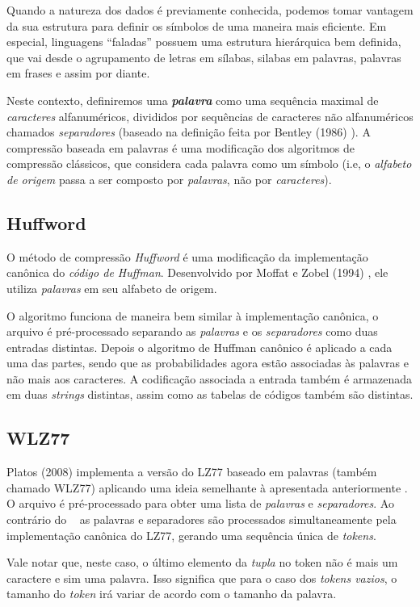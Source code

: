 Quando a natureza dos dados é previamente conhecida, podemos tomar vantagem da sua estrutura para definir os símbolos de uma maneira mais eficiente. 
Em especial, linguagens ``faladas'' possuem uma estrutura hierárquica bem definida, que vai desde o agrupamento de letras em sílabas, silabas em palavras, palavras em frases e assim por diante. 

Neste contexto, definiremos uma \textbf{\emph{palavra}} como uma sequência maximal de \emph{caracteres} alfanuméricos, divididos por sequências de caracteres não alfanuméricos chamados \emph{separadores} (baseado na definição feita por Bentley (1986) \cite{Bentley}).
A compressão baseada em palavras é uma modificação dos algoritmos de compressão clássicos, que considera cada palavra como um símbolo (i.e, o \emph{alfabeto de origem} passa a ser composto por \emph{palavras}, não por \emph{caracteres}).

\subsection{Huffword} \label{sub:huffw}
O método de compressão \emph{Huffword} é uma modificação da implementação canônica do \emph{código de Huffman}. 
Desenvolvido por Moffat e Zobel (1994) \cite{Moffat}, ele utiliza \emph{palavras} em seu alfabeto de origem.

O algoritmo funciona de maneira bem similar à implementação canônica, o arquivo é pré-processado separando as \emph{palavras} e os \emph{separadores} como duas entradas distintas.
Depois o algoritmo de Huffman canônico é aplicado a cada uma das partes, sendo que as probabilidades agora estão associadas às palavras e não mais aos caracteres. 
A codificação associada a entrada também é armazenada em duas \emph{strings} distintas, assim como as tabelas de códigos também são distintas.
 
 \subsection{WLZ77}
Platos (2008) \cite{Platos} implementa a versão do LZ77 baseado em palavras (também chamado WLZ77) aplicando uma ideia semelhante à apresentada anteriormente . 
 O arquivo é pré-processado para obter uma lista de \emph{palavras} e \emph{separadores}. 
 Ao contrário do ~ as palavras e separadores são processados simultaneamente pela implementação canônica do LZ77, gerando uma sequência única de \emph{tokens}.
 
 Vale notar que, neste caso, o último elemento da \emph{tupla} no token não é mais um caractere e sim uma palavra. Isso significa que para o caso dos \emph{tokens vazios}, o tamanho do \emph{token} irá variar de acordo com o tamanho da palavra.
 

